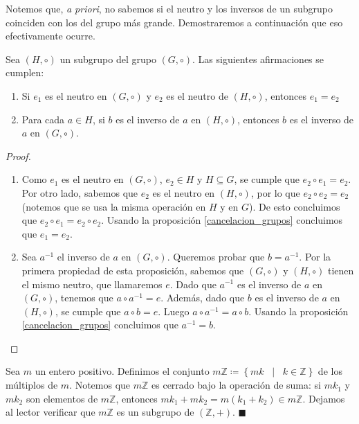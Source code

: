 Notemos que, \textit{a priori}, no sabemos si el neutro y los inversos de un subgrupo coinciden con los del grupo más grande. Demostraremos a continuación que eso efectivamente ocurre.


\begin{proposition}
Sea $(H, \circ)$ un subgrupo del grupo $(G, \circ)$. Las siguientes afirmaciones se cumplen:
	\begin{enumerate}
		\item Si $e_1$ es el neutro en $(G, \circ)$ y $e_2$ es el neutro de $(H, \circ)$, entonces $e_1 = e_2$

		\item Para cada $a \in H$, si $b$ es el inverso de $a$ en $(H, \circ)$, entonces $b$ es el inverso de $a$ en $(G, \circ)$.
	\end{enumerate}
\end{proposition}


\begin{proof} \text{ }
\begin{enumerate}
\item Como $e_1$ es el neutro en $(G, \circ)$, $e_2\in H$ y $H \subseteq G$, se cumple que $e_2 \circ e_1 = e_2$.
Por otro lado, sabemos que $e_2$ es el neutro en $(H, \circ)$, por lo que $e_2 \circ e_2 = e_2$
(notemos que se usa la misma operación en $H$ y en $G$).
De esto concluimos que $e_2 \circ e_1 = e_2 \circ e_2$. Usando la proposición \ref{cancelacion_grupos} concluimos que $e_1 = e_2$.
\item Sea $a^{-1}$ el inverso de $a$ en $(G, \circ)$. Queremos probar que $b = a^{-1}$. Por la primera propiedad de esta proposición, sabemos que $(G, \circ)$ y $(H,
\circ)$ tienen el mismo neutro, que llamaremos $e$. 
Dado que $a^{-1}$ es el inverso de $a$ en $(G, \circ)$, tenemos que $a \circ a^{-1} = e$. Además, dado que $b$ es el inverso de $a$ en $(H, \circ)$, se cumple que $a \circ b = e$. Luego $a \circ a^{-1} = a \circ b$. Usando la proposición \ref{cancelacion_grupos} concluimos que $a^{-1} = b$.
\end{enumerate}
\end{proof}

\begin{example} \label{ejemplo_subgrupo}
Sea $m$ un entero positivo. Definimos el conjunto
$m\mathbb{Z} \coloneq \left\{mk \;\; \mid \;\; k \in \mathbb{Z}\right\}$ de los múltiplos de $m$. Notemos que $m\mathbb{Z}$ es cerrado bajo la operación de suma: si $mk_1$ y $mk_2$ son elementos de $m\mathbb{Z}$, entonces $mk_1 + mk_2 = m(k_1 + k_2) \in m\mathbb{Z}$. Dejamos al lector verificar que $m\mathbb{Z}$ es un subgrupo de $(\mathbb{Z}, +)$. \hfill$\blacksquare$
\end{example}


